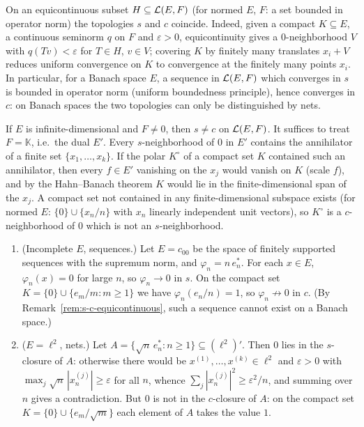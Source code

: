 \begin{remark}
  \label{rem:s-c-equicontinuous}
  On an equicontinuous subset $H \subseteq \mathcal{L}(E, F)$ (for normed $E$, $F$: a set bounded in
  operator norm) the topologies $s$ and $c$ coincide. Indeed, given a compact $K \subseteq E$,
  a continuous seminorm $q$ on $F$ and $\varepsilon > 0$, equicontinuity gives a
  $0$-neighborhood $V$ with $q(T v) < \varepsilon$ for $T \in H$, $v \in V$; covering $K$ by
  finitely many translates $x_i + V$ reduces uniform convergence on $K$ to convergence at the
  finitely many points $x_i$. In particular, for a Banach space $E$, a sequence in
  $\mathcal{L}(E, F)$ which converges in $s$ is bounded in operator norm (uniform boundedness
  principle), hence converges in $c$: on Banach spaces the two topologies can only be
  distinguished by nets.
\end{remark}

\begin{remark}
  \label{rem:c-finer-than-s}
  If $E$ is infinite-dimensional and $F \ne 0$, then $s \ne c$ on $\mathcal{L}(E, F)$. It suffices
  to treat $F = \mathbb{K}$, i.e.\ the dual $E'$. Every $s$-neighborhood of $0$ in $E'$
  contains the annihilator of a finite set $\{x_1, \dots, x_k\}$. If the polar $K^\circ$ of a
  compact set $K$ contained such an annihilator, then every $f \in E'$ vanishing on the
  $x_j$ would vanish on $K$ (scale $f$), and by the Hahn--Banach theorem $K$ would lie in the
  finite-dimensional span of the $x_j$. A compact set not contained in any finite-dimensional
  subspace exists (for normed $E$: $\{0\} \cup \{x_n / n\}$ with $x_n$ linearly independent
  unit vectors), so $K^\circ$ is a $c$-neighborhood of $0$ which is not an $s$-neighborhood.
\end{remark}

\begin{example}
  \label{ex:s-not-c}
  \begin{enumerate}
    \item (Incomplete $E$, sequences.) Let $E = c_{00}$ be the space of finitely supported
      sequences with the supremum norm, and $\varphi_n = n\, e_n^*$. For each $x \in E$,
      $\varphi_n(x) = 0$ for large $n$, so $\varphi_n \to 0$ in $s$. On the compact set
      $K = \{0\} \cup \{e_m / m : m \ge 1\}$ we have $\varphi_n(e_n / n) = 1$, so
      $\varphi_n \not\to 0$ in $c$. (By Remark~\ref{rem:s-c-equicontinuous}, such a sequence
      cannot exist on a Banach space.)
    \item ($E = \ell^2$, nets.) Let $A = \{\sqrt{n}\, e_n^* : n \ge 1\} \subseteq (\ell^2)'$.
      Then $0$ lies in the $s$-closure of $A$: otherwise there would be
      $x^{(1)}, \dots, x^{(k)} \in \ell^2$ and $\varepsilon > 0$ with
      $\max_j \sqrt{n}\,|x^{(j)}_n| \ge \varepsilon$ for all $n$, whence
      $\sum_j |x^{(j)}_n|^2 \ge \varepsilon^2 / n$, and summing over $n$ gives a contradiction.
      But $0$ is not in the $c$-closure of $A$: on the compact set
      $K = \{0\} \cup \{e_m / \sqrt{m}\}$ each element of $A$ takes the value $1$.
  \end{enumerate}
\end{example}

